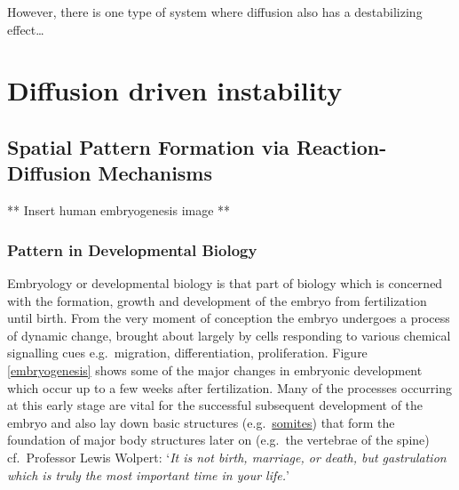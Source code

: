 \documentclass[
  letterpaper,
  DIV=11,
  numbers=noendperiod]{scrreprt}
\theoremstyle{definition}
\theoremstyle{plain}
\theoremstyle{plain}
\theoremstyle{remark}
\begin{document}
However, there is one type of system where diffusion also has a
destabilizing effect\ldots{}

\hypertarget{diffusion-driven-instability}{%
\chapter{Diffusion driven
instability}\label{diffusion-driven-instability}}

\hypertarget{spatial-pattern-formation-via-reaction-diffusion-mechanisms}{%
\section{Spatial Pattern Formation via Reaction-Diffusion
Mechanisms}\label{spatial-pattern-formation-via-reaction-diffusion-mechanisms}}

** Insert human embryogenesis image **

\hypertarget{pattern-in-developmental-biology}{%
\subsection{Pattern in Developmental
Biology}\label{pattern-in-developmental-biology}}

Embryology or developmental biology is that part of biology which is
concerned with the formation, growth and development of the embryo from
fertilization until birth. From the very moment of conception the embryo
undergoes a process of dynamic change, brought about largely by cells
responding to various chemical signalling cues e.g.~migration,
differentiation, proliferation. Figure \ref{embryogenesis} shows some of
the major changes in embryonic development which occur up to a few weeks
after fertilization. Many of the processes occurring at this early stage
are vital for the successful subsequent development of the embryo and
also lay down basic structures
(e.g.~\href{https://en.wikipedia.org/wiki/Somite}{somites}) that form
the foundation of major body structures later on (e.g.~the vertebrae of
the spine) cf.~Professor Lewis Wolpert: `\emph{It is not birth,
marriage, or death, but gastrulation which is truly the most important
time in your life.}'
\end{document}
